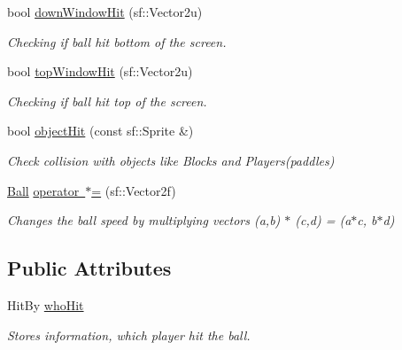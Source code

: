\begin{DoxyCompactItemize}
\mbox{\label{class_ball_aa1bfb33edb1bdbe67380fe2be419ab11}} 
bool \mbox{\hyperlink{class_ball_aa1bfb33edb1bdbe67380fe2be419ab11}{down\+Window\+Hit}} (sf\+::\+Vector2u)
\begin{DoxyCompactList}\small\item\em Checking if ball hit bottom of the screen. \end{DoxyCompactList}\item 
\mbox{\label{class_ball_a5e57d9e1b688dc45f6111d7f52b89ccf}} 
bool \mbox{\hyperlink{class_ball_a5e57d9e1b688dc45f6111d7f52b89ccf}{top\+Window\+Hit}} (sf\+::\+Vector2u)
\begin{DoxyCompactList}\small\item\em Checking if ball hit top of the screen. \end{DoxyCompactList}\item 
\mbox{\label{class_ball_a57806d70f8a4f78ba7e66d425465e1e4}} 
bool \mbox{\hyperlink{class_ball_a57806d70f8a4f78ba7e66d425465e1e4}{object\+Hit}} (const sf\+::\+Sprite \&)
\begin{DoxyCompactList}\small\item\em Check collision with objects like Blocks and Players(paddles) \end{DoxyCompactList}\item 
\mbox{\label{class_ball_a41fb0c62d108caa6e20573598030c648}} 
\mbox{\hyperlink{class_ball}{Ball}} \mbox{\hyperlink{class_ball_a41fb0c62d108caa6e20573598030c648}{operator $\ast$=}} (sf\+::\+Vector2f)
\begin{DoxyCompactList}\small\item\em Changes the ball speed by multiplying vectors (a,b) $\ast$ (c,d) = (a$\ast$c, b$\ast$d) \end{DoxyCompactList}\end{DoxyCompactItemize}
\subsection*{Public Attributes}
\begin{DoxyCompactItemize}
\item 
\mbox{\label{class_ball_aad64a181e6e7c8e028dddde82403c9e5}} 
Hit\+By \mbox{\hyperlink{class_ball_aad64a181e6e7c8e028dddde82403c9e5}{who\+Hit}}
\begin{DoxyCompactList}\small\item\em Stores information, which player hit the ball. \end{DoxyCompactList}\end{DoxyCompactItemize}
